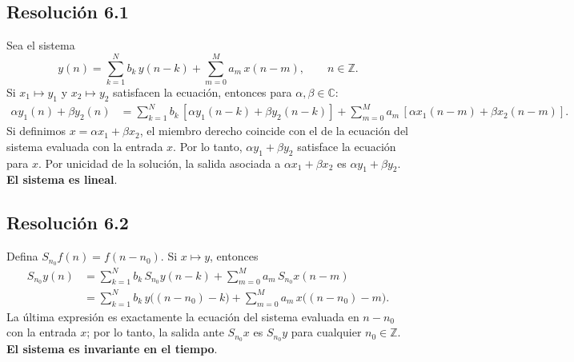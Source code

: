 \documentclass[
  11pt,
  letterpaper,
   addpoints,
  ]{exam}
\begin{document}
\begin{questions}
\begin{solution}
\subsection*{Resolución 6.1}
Sea el sistema
\begin{equation}
  y(n)=\sum_{k=1}^{N} b_k\,y(n-k)+\sum_{m=0}^{M} a_m\,x(n-m),\qquad n\in\mathbb Z .
\end{equation}
Si $x_1\mapsto y_1$ y $x_2\mapsto y_2$ satisfacen la ecuación, entonces para $\alpha,\beta\in\mathbb C$:
\begin{align}
  \alpha y_1(n)+\beta y_2(n)
   &= \sum_{k=1}^{N} b_k\,[\alpha y_1(n-k)+\beta y_2(n-k)]
      + \sum_{m=0}^{M} a_m\,[\alpha x_1(n-m)+\beta x_2(n-m)] .
\end{align}
Si definimos $x=\alpha x_1+\beta x_2$, el miembro derecho coincide con el de la ecuación del sistema evaluada con la entrada $x$. Por lo tanto, $\alpha y_1+\beta y_2$ satisface la ecuación para $x$. Por unicidad de la solución, la salida asociada a $\alpha x_1+\beta x_2$ es $\alpha y_1+\beta y_2$. \textbf{El sistema es lineal}.

\subsection*{Resolución 6.2}
Defina $S_{n_0}f(n)=f(n-n_0)$. Si $x\mapsto y$, entonces
\begin{align}
  S_{n_0}y(n)
  &= \sum_{k=1}^{N} b_k\,S_{n_0}y(n-k) + \sum_{m=0}^{M} a_m\,S_{n_0}x(n-m) \\
  &= \sum_{k=1}^{N} b_k\,y\big((n-n_0)-k\big) + \sum_{m=0}^{M} a_m\,x\big((n-n_0)-m\big).
\end{align}
La última expresión es exactamente la ecuación del sistema evaluada en $n-n_0$ con la entrada $x$; por lo tanto, la salida ante $S_{n_0}x$ es $S_{n_0}y$ para cualquier $n_0\in\mathbb Z$. \textbf{El sistema es invariante en el tiempo}.


\end{solution}
\end{questions}
\end{document}
